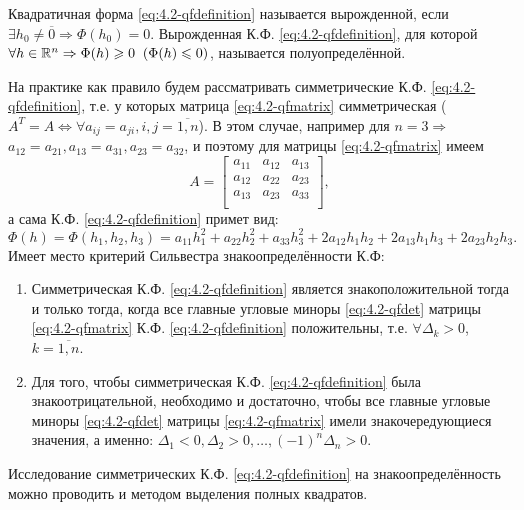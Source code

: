 Квадратичная форма \eqref{eq:4.2-qfdefinition} называется вырожденной, если $\exists h_0 \neq \overline{0} \Rightarrow \Phi(h_0) = 0$. Вырожденная К.Ф. \eqref{eq:4.2-qfdefinition}, для
которой $\forall h \in \mathbb{R}^{n} \Rightarrow \Phi(h) \geqslant 0 \;\; (\Phi(h) \leqslant 0)$,
называется полуопределённой.

На практике как правило будем рассматривать симметрические К.Ф. \eqref{eq:4.2-qfdefinition}, т.е.
у которых матрица \eqref{eq:4.2-qfmatrix} симметрическая ($A^T = A \Leftrightarrow
\forall a_{ij} = a_{ji}, i, j = \overline{1, n}$). В этом случае, например для $n = 3 \Rightarrow$
${a_{12} = a_{21}, a_{13} = a_{31}, a_{23} = a_{32}}$, и поэтому для матрицы \eqref{eq:4.2-qfmatrix}
имеем
\begin{equation*}
	A = \begin{bmatrix}
		a_{11} & a_{12} & a_{13}\\
		a_{12} & a_{22} & a_{23}\\
		a_{13} & a_{23} & a_{33}\\
	\end{bmatrix},
\end{equation*}
а сама К.Ф. \eqref{eq:4.2-qfdefinition} примет вид:
\begin{equation*}
	\Phi(h) = \Phi(h_1, h_2, h_3) = a_{11}h_1^2+ a_{22}h_2^2 + a_{33}h_3^2 + 2a_{12}h_1h_2 +
	2a_{13}h_1h_3 + 2a_{23}h_2h_3.
\end{equation*}
Имеет место критерий Сильвестра знакоопределённости К.Ф:
\begin{enumerate}
  \item Симметрическая К.Ф. \eqref{eq:4.2-qfdefinition} является знакоположительной тогда и только
	тогда, когда все главные угловые миноры \eqref{eq:4.2-qfdet} матрицы \eqref{eq:4.2-qfmatrix} К.Ф.
	\eqref{eq:4.2-qfdefinition} положительны, т.е. $\forall \Delta_k > 0$, $ k = \overline{1, n}$.
  \item Для того, чтобы симметрическая К.Ф. \eqref{eq:4.2-qfdefinition} была знакоотрицательной,
	необходимо и достаточно, чтобы все главные угловые миноры \eqref{eq:4.2-qfdet} матрицы
	\eqref{eq:4.2-qfmatrix} имели знакочередующиеся значения, а именно:
	${\Delta_1 < 0, \Delta_2 > 0, \ldots, (-1)^n\Delta_n > 0}$.
\end{enumerate}
Исследование симметрических К.Ф. \eqref{eq:4.2-qfdefinition} на знакоопределённость можно проводить
и методом выделения полных квадратов.

